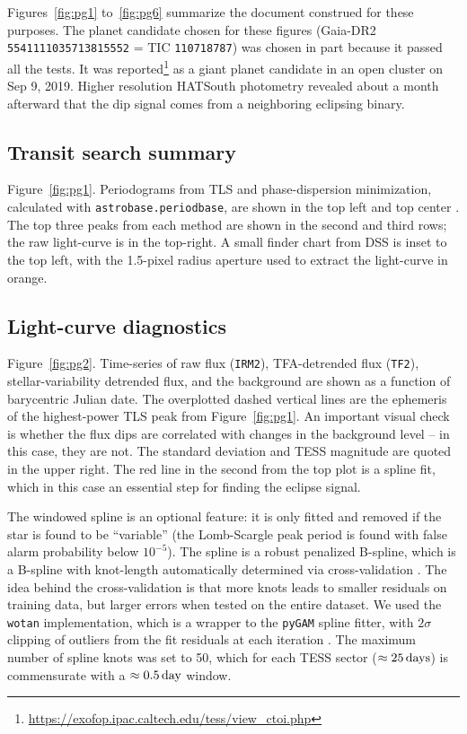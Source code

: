 \documentclass[12pt,twocolumn,tighten]{aastex62}
\begin{document}
Figures~\ref{fig:pg1} to~\ref{fig:pg6} summarize the document
construed for these purposes.  The planet candidate chosen for these
figures (Gaia-DR2 \texttt{5541111035713815552} = TIC
\texttt{110718787}) was chosen in part because it passed all the
tests.  It was reported\footnote{\url{https://exofop.ipac.caltech.edu/tess/view_ctoi.php}}
as a giant planet candidate in an open cluster
on Sep 9, 2019.  Higher
resolution HATSouth photometry revealed about a month afterward that
the dip signal comes from a neighboring eclipsing binary.

\subsection{Transit search summary}
\label{sec:pg1}

Figure~\ref{fig:pg1}.
Periodograms from TLS and phase-dispersion minimization, calculated
with \texttt{astrobase.periodbase}, are shown in the top left and top
center
\citep{bhatti_astrobase_2018,hippke_TLS_2019,stellingwerf_period_1978}.
The top three peaks from each method are shown in the second and third
rows; the raw light-curve is in the top-right. A small finder chart
from DSS is inset to the top left, with the 1.5-pixel radius aperture
used to extract the light-curve in orange.

\subsection{Light-curve diagnostics}
\label{sec:pg2}

Figure~\ref{fig:pg2}.
Time-series of raw flux (\texttt{IRM2}),  TFA-detrended flux
(\texttt{TF2}), stellar-variability detrended flux, and the background
are shown as a function of barycentric Julian date.  The overplotted
dashed vertical lines are the ephemeris of the highest-power TLS peak
from Figure~\ref{fig:pg1}.  An important visual check is whether the flux
dips are correlated with changes in the background level -- in this
case, they are not.  The standard deviation and TESS magnitude are
quoted in the upper right.  The red line in the second from the top
plot is a spline fit, which in this case an essential step for finding
the eclipse signal.

The windowed spline is an optional feature: it is only fitted and
removed if the star is found to be ``variable'' (the Lomb-Scargle peak
period is found with false alarm probability below $10^{-5}$). The
spline is a robust penalized B-spline, which is a B-spline with
knot-length automatically determined via cross-validation
\citep{eilers_flexible_1996}. The idea behind the cross-validation is
that more knots leads to smaller residuals on training data, but
larger errors when tested on the entire dataset.  We used the
\texttt{wotan} implementation, which is a wrapper to the
\texttt{pyGAM} spline fitter, with $2\sigma$ clipping of outliers from
the fit residuals at each iteration
\citep{serven_pygam_2018_1476122,hippke_wotan_2019}.  The maximum
number of spline knots was set to 50, which for each TESS sector
($\approx 25\,{\rm days}$) is commensurate with a $\approx0.5\,{\rm
day}$ window.
\end{document}
